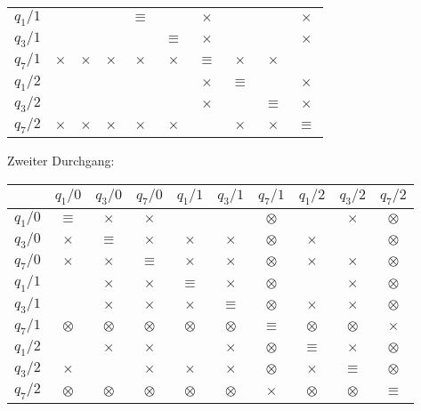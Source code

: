 \begin{loesung}
\begin{teilaufgaben}
\begin{center}
\begin{tabular}{|c|ccccccccc|}
$q_1/1$  &         &         &         &$\equiv$ &         &$\times$ &         &         &$\times$ \\
$q_3/1$  &         &         &         &         &$\equiv$ &$\times$ &         &         &$\times$ \\
$q_7/1$  &$\times$ &$\times$ &$\times$ &$\times$ &$\times$ &$\equiv$ &$\times$ &$\times$ &         \\
$q_1/2$  &         &         &         &         &         &$\times$ &$\equiv$ &         &$\times$ \\
$q_3/2$  &         &         &         &         &         &$\times$ &         &$\equiv$ &$\times$ \\
$q_7/2$  &$\times$ &$\times$ &$\times$ &$\times$ &$\times$ &         &$\times$ &$\times$ &$\equiv$ \\
\hline
\end{tabular}
\end{center}
Zweiter Durchgang:
\begin{center}
\begin{tabular}{|c|ccccccccc|}
\hline
         &$q_1/0$  &$q_3/0$  &$q_7/0$  &$q_1/1$  &$q_3/1$  &$q_7/1$  &$q_1/2$  &$q_3/2$  &$q_7/2$  \\
\hline
$q_1/0$  &$\equiv$ &$\times$ &$\times$ &         &         &$\otimes$&         &$\times$ &$\otimes$\\
$q_3/0$  &$\times$ &$\equiv$ &$\times$ &$\times$ &$\times$ &$\otimes$&$\times$ &         &$\otimes$\\
$q_7/0$  &$\times$ &$\times$ &$\equiv$ &$\times$ &$\times$ &$\otimes$&$\times$ &$\times$ &$\otimes$\\
$q_1/1$  &         &$\times$ &$\times$ &$\equiv$ &$\times$ &$\otimes$&         &$\times$ &$\otimes$\\
$q_3/1$  &         &$\times$ &$\times$ &$\times$ &$\equiv$ &$\otimes$&$\times$ &$\times$ &$\otimes$\\
$q_7/1$  &$\otimes$&$\otimes$&$\otimes$&$\otimes$&$\otimes$&$\equiv$ &$\otimes$&$\otimes$&$\times$ \\
$q_1/2$  &         &$\times$ &$\times$ &         & $\times$&$\otimes$&$\equiv$& $\times$&$\otimes$\\
$q_3/2$  &$\times$ &         &$\times$ &$\times$ &$\times$ &$\otimes$&$\times$ &$\equiv$ &$\otimes$\\
$q_7/2$  &$\otimes$&$\otimes$&$\otimes$&$\otimes$&$\otimes$&$\times$ &$\otimes$&$\otimes$&$\equiv$ \\
\hline
\end{tabular}

\end{center}
\end{teilaufgaben}
\end{loesung}

